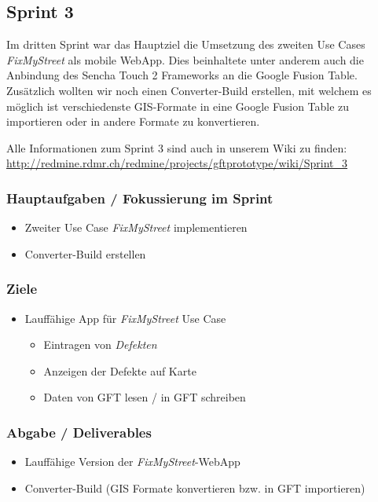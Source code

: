 \subsection{Sprint 3}

Im dritten Sprint war das Hauptziel die Umsetzung des zweiten Use Cases \emph{FixMyStreet} als mobile WebApp. Dies beinhaltete unter anderem auch die Anbindung des Sencha Touch 2 Frameworks an die Google Fusion Table.
Zusätzlich wollten wir noch einen Converter-Build erstellen, mit welchem es möglich ist verschiedenste \gls{GIS}-Formate in eine Google Fusion Table zu importieren oder in andere Formate zu konvertieren.

Alle Informationen zum Sprint 3 sind auch in unserem Wiki zu finden:
\url{http://redmine.rdmr.ch/redmine/projects/gftprototype/wiki/Sprint_3}

\subsubsection{Hauptaufgaben / Fokussierung im Sprint}
\begin{itemize}
	\item Zweiter Use Case \emph{FixMyStreet} implementieren
	\item Converter-Build erstellen
\end{itemize}

\subsubsection{Ziele}
\begin{itemize}
	\item Lauffähige App für \emph{FixMyStreet} Use Case
	\begin{itemize}
		\item Eintragen von \emph{Defekten}
		\item Anzeigen der Defekte auf Karte
		\item Daten von GFT lesen / in GFT schreiben
	\end{itemize}
\end{itemize}

\subsubsection{Abgabe / Deliverables}
\begin{itemize}
	\item Lauffähige Version der \emph{FixMyStreet}-WebApp
	\item Converter-Build (GIS Formate konvertieren bzw. in GFT importieren)
\end{itemize}

